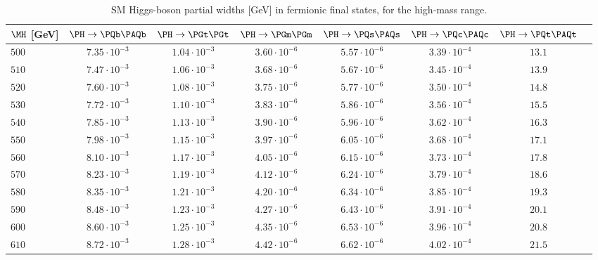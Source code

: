 \begin{table}
  \vspace{-\headsep}
  \caption{SM Higgs-boson partial widths [GeV] in fermionic final states, for the high-mass range.}
  \label{tab:Width-hm.part1}
  \centering
  \small
  \begin{tabular}{lccccccc}\hline
$\MH$ [GeV] & $\PH \rightarrow \PQb\PAQb$ &  $\PH \rightarrow 
\PGt \PGt$ & $\PH \rightarrow \PGm \PGm$ & $\PH \rightarrow \PQs \PAQs$ & 
$\PH \rightarrow \PQc \PAQc$
& $\PH \rightarrow \PQt \PAQt$ \\
\hline
$500 $&$ 7.35\cdot 10^{-3} $&$ 1.04\cdot 10^{-3} $&$ 3.60\cdot 10^{-6} $&$ 5.57\cdot 10^{-6} $&$ 3.39\cdot 10^{-4} $&$ 13.1$\\
$510 $&$ 7.47\cdot 10^{-3} $&$ 1.06\cdot 10^{-3} $&$ 3.68\cdot 10^{-6} $&$ 5.67\cdot 10^{-6} $&$ 3.45\cdot 10^{-4} $&$ 13.9$\\
$520 $&$ 7.60\cdot 10^{-3} $&$ 1.08\cdot 10^{-3} $&$ 3.75\cdot 10^{-6} $&$ 5.77\cdot 10^{-6} $&$ 3.50\cdot 10^{-4} $&$ 14.8$\\
$530 $&$ 7.72\cdot 10^{-3} $&$ 1.10\cdot 10^{-3} $&$ 3.83\cdot 10^{-6} $&$ 5.86\cdot 10^{-6} $&$ 3.56\cdot 10^{-4} $&$ 15.5$\\
$540 $&$ 7.85\cdot 10^{-3} $&$ 1.13\cdot 10^{-3} $&$ 3.90\cdot 10^{-6} $&$ 5.96\cdot 10^{-6} $&$ 3.62\cdot 10^{-4} $&$ 16.3$\\
$550 $&$ 7.98\cdot 10^{-3} $&$ 1.15\cdot 10^{-3} $&$ 3.97\cdot 10^{-6} $&$ 6.05\cdot 10^{-6} $&$ 3.68\cdot 10^{-4} $&$ 17.1$\\
$560 $&$ 8.10\cdot 10^{-3} $&$ 1.17\cdot 10^{-3} $&$ 4.05\cdot 10^{-6} $&$ 6.15\cdot 10^{-6} $&$ 3.73\cdot 10^{-4} $&$ 17.8$\\
$570 $&$ 8.23\cdot 10^{-3} $&$ 1.19\cdot 10^{-3} $&$ 4.12\cdot 10^{-6} $&$ 6.24\cdot 10^{-6} $&$ 3.79\cdot 10^{-4} $&$ 18.6$\\
$580 $&$ 8.35\cdot 10^{-3} $&$ 1.21\cdot 10^{-3} $&$ 4.20\cdot 10^{-6} $&$ 6.34\cdot 10^{-6} $&$ 3.85\cdot 10^{-4} $&$ 19.3$\\
$590 $&$ 8.48\cdot 10^{-3} $&$ 1.23\cdot 10^{-3} $&$ 4.27\cdot 10^{-6} $&$ 6.43\cdot 10^{-6} $&$ 3.91\cdot 10^{-4} $&$ 20.1$\\
$600 $&$ 8.60\cdot 10^{-3} $&$ 1.25\cdot 10^{-3} $&$ 4.35\cdot 10^{-6} $&$ 6.53\cdot 10^{-6} $&$ 3.96\cdot 10^{-4} $&$ 20.8$\\
$610 $&$ 8.72\cdot 10^{-3} $&$ 1.28\cdot 10^{-3} $&$ 4.42\cdot 10^{-6} $&$ 6.62\cdot 10^{-6} $&$ 4.02\cdot 10^{-4} $&$ 21.5$\\

\end{tabular}
\end{table}
